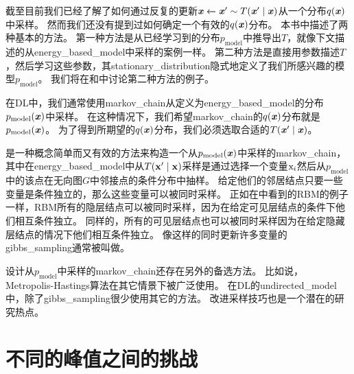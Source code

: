 截至目前我们已经了解了如何通过反复的更新$\boldsymbol{\mathit{x}} \xleftarrow{} \boldsymbol{\mathit{x}}'\sim T(\boldsymbol{\mathit{x}}'\mid\boldsymbol{\mathit{x}})$从一个分布$q(\boldsymbol{\mathit{x}})$中采样。
然而我们还没有提到过如何确定一个有效的$q(\boldsymbol{\mathit{x}})$分布。
本书中描述了两种基本的方法。
第一种方法是从已经学习到的分布$p_{\text{model}}$中推导出$T$，就像下文描述的从\gls{energy_based_model}中采样的案例一样。
第二种方法是直接用参数描述$T$，然后学习这些参数，其\gls{stationary_distribution}隐式地定义了我们所感兴趣的模型$p_{\text{model}}$。
我们将在和中讨论第二种方法的例子。


在\gls{DL}中，我们通常使用\gls{markov_chain}从定义为\gls{energy_based_model}的分布$p_{\text{model}}(\boldsymbol{\mathit{x}})$中采样。
在这种情况下，我们希望\gls{markov_chain}的$q(\boldsymbol{\mathit{x}})$分布就是$p_{\text{model}}(\boldsymbol{\mathit{x}})$。
为了得到所期望的$q(\boldsymbol{\mathit{x}})$分布，我们必须选取合适的$T(\boldsymbol{\mathit{x}}'\mid \boldsymbol{\mathit{x}})$。


是一种概念简单而又有效的方法来构造一个从$p_{\text{model}}(\boldsymbol{\mathit{x}})$中采样的\gls{markov_chain}，其中在\gls{energy_based_model}中从$T(\mathbf{x}'\mid \mathbf{x})$采样是通过选择一个变量$\mathrm{x}_i$然后从$p_{\text{model}}$中的该点在无向图$G$中邻接点的条件分布中抽样。
给定他们的邻居结点只要一些变量是条件独立的，那么这些变量可以被同时采样。
正如在中看到的\gls{RBM}的例子一样，\gls{RBM}所有的隐层结点可以被同时采样，因为在给定可见层结点的条件下他们相互条件独立。
同样的，所有的可见层结点也可以被同时采样因为在给定隐藏层结点的情况下他们相互条件独立。
像这样的同时更新许多变量的\gls{gibbs_sampling}通常被叫做。

设计从$p_{\text{model}}$中采样的\gls{markov_chain}还存在另外的备选方法。
比如说，Metropolis-Hastings算法在其它情景下被广泛使用。
在\gls{DL}的\gls{undirected_model}中，除了\gls{gibbs_sampling}很少使用其它的方法。
改进采样技巧也是一个潜在的研究热点。


\section{不同的峰值之间的挑战}
\label{sec:the_challenge_of_mixing_between_separated_modes}

